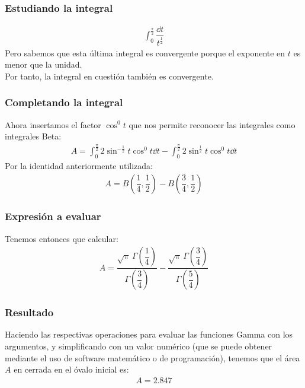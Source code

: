\begin{frame}
\frametitle{Estudiando la integral}
\begin{align*}
\int_{0}^{\frac{\pi}{2}} \dfrac{\dd{t}}{t^{\frac{1}{2}}}
\end{align*}
Pero sabemos que esta última integral es convergente porque el exponente en $t$ es menor que la unidad.
\\
\bigskip
\pause
Por tanto, la integral en cuestión también es convergente.
\end{frame}
\begin{frame}
\frametitle{Completando la integral}
Ahora insertamos el factor $\cos^{0} t$ que nos permite reconocer las integrales como integrales Beta:
\begin{align*}
A = \int_{0}^{\frac{\pi}{2}} 2 \sin^{-\frac{1}{2}} t \cos^{0} t \dd{t} - \int_{0}^{\frac{\pi}{2}} 2 \sin^{\frac{1}{2}} t \cos^{0} t \dd{t}
\end{align*}
\pause
Por la identidad anteriormente utilizada:
\begin{align*}
A = B \left( \dfrac{1}{4}, \dfrac{1}{2} \right) - B \left( \dfrac{3}{4}, \dfrac{1}{2} \right)
\end{align*}
\end{frame}
\begin{frame}
\frametitle{Expresión a evaluar}
Tenemos entonces que calcular:
\begin{align*}
A = \dfrac{\sqrt{\pi} \, \Gamma \left( \dfrac{1}{4} \right)}{\Gamma \left( \dfrac{3}{4} \right)} - \dfrac{\sqrt{\pi} \, \Gamma \left( \dfrac{3}{4} \right)}{\Gamma \left( \dfrac{5}{4} \right)}
\end{align*}
\end{frame}
\begin{frame}
\frametitle{Resultado}
Haciendo las respectivas operaciones para evaluar las funciones Gamma con los argumentos, y simplificando con un valor numérico (que se puede obtener mediante el uso de software matemático o de programación), tenemos que el área $A$ en cerrada en el óvalo inicial es:
\pause
\begin{align*}
A = 2.847
\end{align*}
\end{frame}

